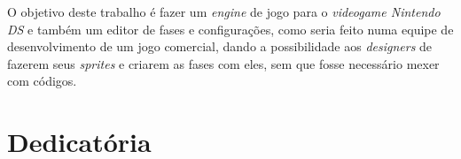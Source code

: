 \documentclass[brazil]{abnt}
\begin{document}

\Ncapa
\NFolhaDeRosto



\begin{resumo}
O objetivo deste trabalho é fazer um \textit{engine} de jogo para o \textit{videogame Nintendo DS\texttrademark} e também um editor de fases 
e configurações, como seria feito numa equipe de desenvolvimento de um jogo comercial, dando a possibilidade aos \textit{designers} 
de fazerem seus \textit{sprites} e criarem as fases com eles, sem que fosse necessário mexer com códigos.
\end{resumo}

\begin{abstract}
The objective of this paper is to make a game engine to the Nintendo DS\texttrademark system and a level and configurations editor, as it
would be done in a development team in a comercial game, giving designers the possibility to make their sprites and create their levels 
without touching actual source code.
\end{abstract}

\chapter*{Dedicatória}
\end{document}
